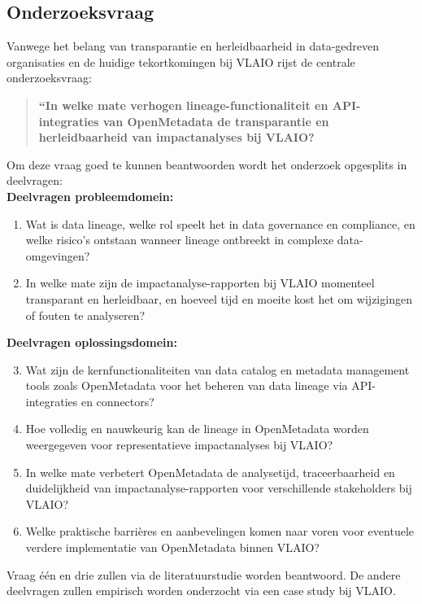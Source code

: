\subsection{Onderzoeksvraag}

Vanwege het belang van transparantie en herleidbaarheid in data-gedreven organisaties en de huidige tekortkomingen bij VLAIO rijst de centrale onderzoeksvraag:

\begin{quote}
\textbf{“In welke mate verhogen lineage-functionaliteit en API-integraties van OpenMetadata de transparantie en herleidbaarheid van impactanalyses bij VLAIO?}
\end{quote}

\noindent Om deze vraag goed te kunnen beantwoorden wordt het onderzoek opgesplits in deelvragen:\\


\textbf{Deelvragen probleemdomein:}

\begin{enumerate}
    \item Wat is data lineage, welke rol speelt het in data governance en compliance, en welke risico's ontstaan wanneer lineage ontbreekt in complexe data-omgevingen?
    \item In welke mate zijn de impactanalyse-rapporten bij VLAIO momenteel transparant en herleidbaar, en hoeveel tijd en moeite kost het om wijzigingen of fouten te analyseren?
\end{enumerate}

\textbf{Deelvragen oplossingsdomein:}
\begin{enumerate}
    \setcounter{enumi}{2} 
    \item Wat zijn de kernfunctionaliteiten van data catalog en metadata management tools zoals OpenMetadata voor het beheren van data lineage via API-integraties en connectors?
    \item Hoe volledig en nauwkeurig kan de lineage in OpenMetadata worden weergegeven voor representatieve impactanalyses bij VLAIO?
    \item In welke mate verbetert OpenMetadata de analysetijd, traceerbaarheid en duidelijkheid van impactanalyse-rapporten voor verschillende stakeholders bij VLAIO?
    \item Welke praktische barrières en aanbevelingen komen naar voren voor eventuele verdere implementatie van OpenMetadata binnen VLAIO?
\end{enumerate}
Vraag één en drie zullen via de literatuurstudie worden beantwoord. De andere deelvragen zullen empirisch worden onderzocht via een case study bij VLAIO.

